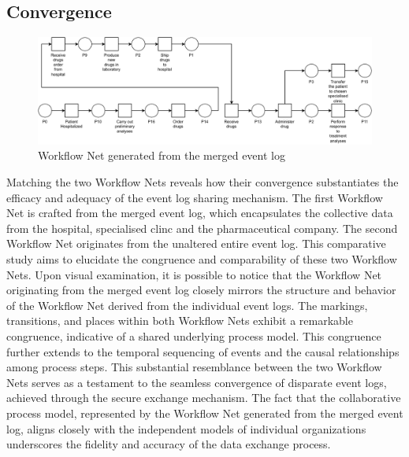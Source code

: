 \subsection{Convergence}

\begin{figure}[t]
\centering
\includegraphics[width= 0.9\linewidth]{content/figures/mergedpetri.pdf}
\caption{Workflow Net generated from the merged event log}
\label{fig:merged_petri}
\end{figure}

Matching the two Workflow Nets reveals how their convergence substantiates the efficacy and adequacy of the event log sharing mechanism. The first Workflow Net is crafted from the merged event log, which encapsulates the collective data from the hospital, specialised clinc and the pharmaceutical company. The second Workflow Net originates from the unaltered entire event log. This comparative study aims to elucidate the congruence and comparability of these two Workflow Nets.
Upon visual examination, it is possible to notice that the Workflow Net originating from the merged event log closely mirrors the structure and behavior of the Workflow Net derived from the individual event logs. The markings, transitions, and places within both Workflow Nets exhibit a remarkable congruence, indicative of a shared underlying process model. This congruence further extends to the temporal sequencing of events and the causal relationships among process steps. This substantial resemblance between the two Workflow Nets serves as a testament to the seamless convergence of disparate event logs, achieved through the secure exchange mechanism. The fact that the collaborative process model, represented by the Workflow Net generated from the merged event log, aligns closely with the independent models of individual organizations underscores the fidelity and accuracy of the data exchange process.

